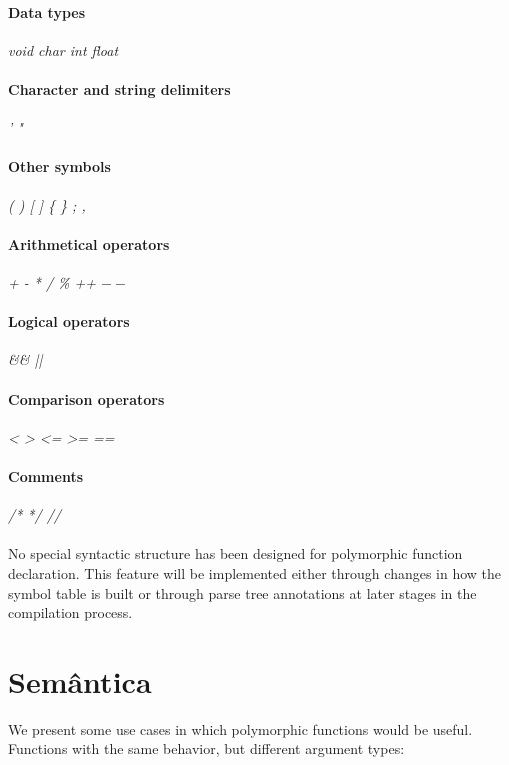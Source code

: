 \documentclass[11pt]{article}
\begin{document}
\paragraph{Data types} \textit{void char int float}

\paragraph{Character and string delimiters} \textit{' "}

\paragraph{Other symbols} \textit{( ) [ ] \{ \} ; ,}

\paragraph{Arithmetical operators} \textit{+ - * / \% ++ $--$}

\paragraph{Logical operators} \textit{\&\& ||}

\paragraph{Comparison operators} \textit{< > <= >= ==}

\paragraph{Comments} \textit{/* */ //}

\paragraph{} No special syntactic structure has been designed for polymorphic function declaration. This feature will be implemented either through changes in how the symbol table is built or through parse tree annotations at later stages in the compilation process.

\section{Semântica}

We present some use cases in which polymorphic functions would be useful. Functions with the same behavior, but different argument types:
\end{document}
